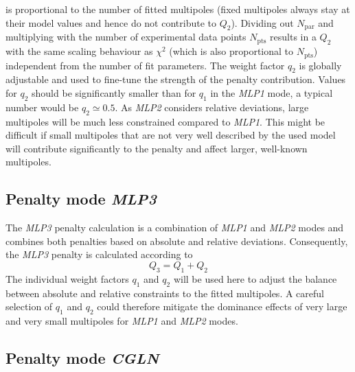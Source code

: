 \documentclass[a4paper,10pt]{article}
\begin{document}
is proportional to the number of fitted multipoles (fixed multipoles always stay at their model values and hence do not
contribute to $Q_2$). Dividing out $N_\mathrm{par}$ and multiplying with the number of experimental data points
$N_\mathrm{pts}$ results in a $Q_2$ with the same scaling behaviour as $\chi^2$ (which is also proportional to $N_\mathrm{pts}$)
independent from the number of fit parameters.
The weight factor $q_2$ is globally adjustable and used to fine-tune the strength of the penalty contribution.
Values for $q_2$ should be significantly smaller than for $q_1$ in the \textit{MLP1} mode, a typical number
would be $q_2 \simeq 0.5$.
As \textit{MLP2} considers relative deviations, large multipoles will be much less constrained compared to \textit{MLP1}.
This might be difficult if small multipoles that are not very well described by the used model
will contribute significantly to the penalty and affect larger, well-known multipoles.

\subsection{Penalty mode \textit{MLP3}}

The \textit{MLP3} penalty calculation is a combination of \textit{MLP1} and \textit{MLP2} modes and combines both
penalties based on absolute and relative deviations. Consequently, the \textit{MLP3} penalty is calculated according to
\begin{displaymath}
Q_3 = Q_1 + Q_2
\end{displaymath}
The individual weight factors $q_1$ and $q_2$ will be used here to adjust the balance between absolute and relative
constraints to the fitted multipoles. A careful selection of $q_1$ and $q_2$ could therefore mitigate 
the dominance effects of very large and very small multipoles for \textit{MLP1} and \textit{MLP2} modes.

\subsection{Penalty mode \textit{CGLN}}
\end{document}
